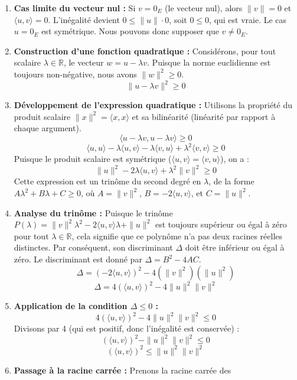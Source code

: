 \documentclass[11pt,a4paper]{report}
\begin{document}
\begin{enumerate}
\def\labelenumi{\arabic{enumi}.}
\item
  \textbf{Cas limite du vecteur nul :} Si \(v = 0_E\) (le vecteur nul),
  alors \(\|v\| = 0\) et \(\langle u, v \rangle = 0\). L'inégalité
  devient \(0 \le \|u\| \cdot 0\), soit \(0 \le 0\), qui est vraie. Le
  cas \(u = 0_E\) est symétrique. Nous pouvons donc supposer que
  \(v \neq 0_E\).
\item
  \textbf{Construction d'une fonction quadratique :} Considérons, pour
  tout scalaire \(\lambda \in \mathbb{R}\), le vecteur
  \(w = u - \lambda v\). Puisque la norme euclidienne est toujours
  non-négative, nous avons \(\|w\|^2 \ge 0\).
  \[ \|u - \lambda v\|^2 \ge 0 \]
\item
  \textbf{Développement de l'expression quadratique :} Utilisons la
  propriété du produit scalaire \(\|x\|^2 = \langle x, x \rangle\) et sa
  bilinéarité (linéarité par rapport à chaque argument).
  \[ \langle u - \lambda v, u - \lambda v \rangle \ge 0 \]
  \[ \langle u, u \rangle - \lambda \langle u, v \rangle - \lambda \langle v, u \rangle + \lambda^2 \langle v, v \rangle \ge 0 \]
  Puisque le produit scalaire est symétrique
  (\(\langle u, v \rangle = \langle v, u \rangle\)), on a :
  \[ \|u\|^2 - 2\lambda \langle u, v \rangle + \lambda^2 \|v\|^2 \ge 0 \]
  Cette expression est un trinôme du second degré en \(\lambda\), de la
  forme \(A\lambda^2 + B\lambda + C \ge 0\), où \(A = \|v\|^2\),
  \(B = -2\langle u, v \rangle\), et \(C = \|u\|^2\).
\item
  \textbf{Analyse du trinôme :} Puisque le trinôme
  \(P(\lambda) = \|v\|^2 \lambda^2 - 2\langle u, v \rangle \lambda + \|u\|^2\)
  est toujours supérieur ou égal à zéro pour tout
  \(\lambda \in \mathbb{R}\), cela signifie que ce polynôme n'a pas deux
  racines réelles distinctes. Par conséquent, son discriminant
  \(\Delta\) doit être inférieur ou égal à zéro. Le discriminant est
  donné par \(\Delta = B^2 - 4AC\).
  \[ \Delta = (-2\langle u, v \rangle)^2 - 4(\|v\|^2)(\|u\|^2) \]
  \[ \Delta = 4(\langle u, v \rangle)^2 - 4\|u\|^2 \|v\|^2 \]
\item
  \textbf{Application de la condition \(\Delta \le 0\) :}
  \[ 4(\langle u, v \rangle)^2 - 4\|u\|^2 \|v\|^2 \le 0 \] Divisons par
  4 (qui est positif, donc l'inégalité est conservée) :
  \[ (\langle u, v \rangle)^2 - \|u\|^2 \|v\|^2 \le 0 \]
  \[ (\langle u, v \rangle)^2 \le \|u\|^2 \|v\|^2 \]
\item
  \textbf{Passage à la racine carrée :} Prenons la racine carrée des

\end{enumerate}
\end{document}
